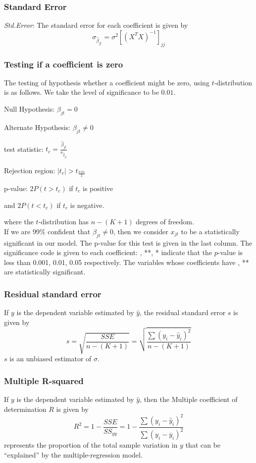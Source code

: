 \documentclass[12pt]{article}
\begin{document}
\subsubsection{Standard Error} \textit{Std.Error}: The standard error for each coefficient is given by
$$\sigma_{\hat \beta_{jt}}=\sigma^2[(X^TX)^{-1}]_{jj}$$
\subsubsection{Testing if a coefficient is zero} The testing of hypothesis whether a coefficient might be zero, using $t$-distribution is as follows.  We take the level of significance to be $0.01$.
    \begin{center}
        Null Hypothesis: $\beta_{jt}=0$
        
        Alternate Hypothesis: $\beta_{jt}\neq 0$
        
        test statistic: $t_c=\frac{\hat \beta_{jt}}{s_{\hat \beta_{jt}}}$
        
        Rejection region: $|t_c|>t_{\frac{0.01}{2}}$
        
        p-value: $2P(t>t_c)$ if $t_c$ is positive 
        
        and $2P(t<t_c)$ if $t_c$ is negative.
    \end{center} 
where the $t$-distribution has $n-(K+1)$ degrees of freedom.
\\ If we are 99\% confident that $\beta_{jt}\neq 0$, then we consider $x_{jt}$ to be a statistically significant in our model.
The p-value for this test is given in the last column. The significance code is given to each coefficient: , **, * indicate that the $p$-value is less than 0.001, 0.01, 0.05 respectively. The variables whose coefficients have , ** are statistically significant.
\subsubsection{{Residual standard error}} If $y$ is the dependent variable estimated by $\hat y$, the residual standard error $s$ is given by
$$s=\sqrt{\frac{SSE}{n-(K+1)}}=\sqrt{\frac{\sum {(y_i-\hat y_i)^2}}{n-(K+1)}}$$
$s$ is an unbiased estimator of $\sigma$.
\subsubsection{{Multiple R-squared}} If $y$ is the dependent variable estimated by $\hat y$, then the Multiple coefficient of determination $R$ is given by $$R^2=1-\frac{SSE}{SS_{yy}}=1-\frac{\sum {(y_i-\hat y_i)^2}}{\sum {(y_i- \overline{y}_i)^2}}$$ 
represents  the  proportion  of  the  total  sample  variation  in  $y$  that  can  be  ``explained'' by the multiple-regression model.
\end{document}
